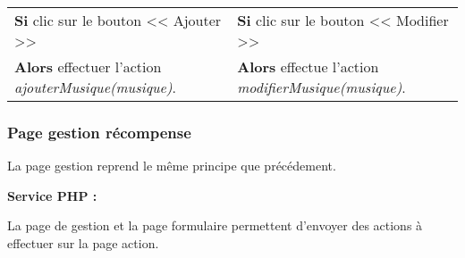             \begin{center}
                \begin{tabular}{l | l}
                    \textbf{Si} clic sur le bouton << Ajouter >> & \textbf{Si} clic sur le bouton << Modifier >> \\
                    \textbf{Alors} effectuer l'action \emph{ajouterMusique(musique)}. & \textbf{Alors} effectue l'action \emph{modifierMusique(musique)}.
                \end{tabular}
            \end{center}
            
            







            
	\clearpage

		\subsubsection{Page gestion récompense}

			\begin{paragraphe}
                La page gestion reprend le même principe que précédement.
			\end{paragraphe}

			\begin{paragraphe}
				\textbf{Service PHP :}
			\end{paragraphe}
            
            \begin{paragraphe}
                La page de gestion et la page formulaire permettent d'envoyer des actions à effectuer sur la page action.
			\end{paragraphe}

